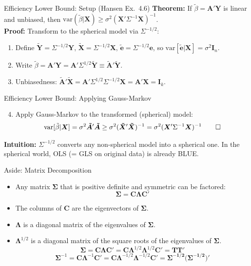 \documentclass[aspectratio=169, handout]{beamer}
\numberwithin{equation}{section}
\begin{document}
\begin{frame}{Efficiency Lower Bound: Setup (Hansen Ex.\ 4.6)}
\textbf{Theorem:} If $\tilde{\beta}=\bm{A'Y}$ is linear and unbiased, then $\text{var}(\tilde{\beta}|\bm{X})\geq \sigma^2(\bm{X}'\Sigma^{-1}\bm{X})^{-1}$.\\ \medskip\pause
\textbf{Proof:} Transform to the spherical model via $\Sigma^{-1/2}$:
\begin{enumerate}
\item Define $\bm{\tilde{Y}}=\Sigma^{-1/2}\bm{Y}$, $\bm{\tilde{X}}=\Sigma^{-1/2}\bm{X}$, $\bm{\tilde{e}}=\Sigma^{-1/2}\bm{e}$, so $\text{var}[\bm{\tilde{e}}|\bm{X}]=\sigma^2\bm{I}_n$.\pause
\item Write $\tilde{\beta}=\bm{A'Y}=\bm{A}'\Sigma^{1/2}\bm{\tilde{Y}}\equiv\bm{\tilde{A}}'\bm{\tilde{Y}}$.\pause
\item Unbiasedness: $\bm{\tilde{A}}'\bm{\tilde{X}}=\bm{A}'\Sigma^{1/2}\Sigma^{-1/2}\bm{X}=\bm{A'X}=\bm{I}_k$.
\end{enumerate}
\end{frame}

\begin{frame}{Efficiency Lower Bound: Applying Gauss-Markov}
\begin{enumerate}\setcounter{enumi}{3}
\item Apply Gauss-Markov to the transformed (spherical) model:
$$\text{var}[\tilde{\beta}|\bm{X}]=\sigma^2\bm{\tilde{A}}'\bm{\tilde{A}}\geq \sigma^2(\bm{\tilde{X}}'\bm{\tilde{X}})^{-1}=\sigma^2(\bm{X}'\Sigma^{-1}\bm{X})^{-1} \qed$$
\end{enumerate}\pause
\medskip
\textbf{Intuition:} $\Sigma^{-1/2}$ converts any non-spherical model into a spherical one.  In the spherical world, OLS (= GLS on original data) is already BLUE.
\end{frame}

\begin{frame}{Aside: Matrix Decomposition}
\begin{itemize}
\item Any matrix $\bm{\Sigma}$ that is positive definite and symmetric can be factored:
$$\bm{\Sigma}=\bm{C}\bm{\Lambda}\bm{C'}$$
\item The columns of $\bm{C}$ are the eigenvectors of $\bm{\Sigma}$.
\item $\bm{\Lambda}$ is a diagonal matrix of the eigenvalues of $\bm{\Sigma}$.
\item $\bm{\Lambda}^{1/2}$ is a diagonal matrix of the square roots of the eigenvalues of $\bm{\Sigma}$.
$$\bm{\Sigma}=\bm{C}\bm{\Lambda}\bm{C'}=\bm{C}\bm{\Lambda}^{1/2}\bm{\Lambda}^{1/2}\bm{C'}=\bm{TT'}$$
$$\bm{\Sigma}^{-1}=\bm{C}\bm{\Lambda}^{-1}\bm{C'}=\bm{C}\bm{\Lambda}^{-1/2}\bm{\Lambda}^{-1/2}\bm{C'}=\bm{\Sigma^{-1/2}(\Sigma^{-1/2}})'$$
\end{itemize}
\end{frame}
\end{document}
